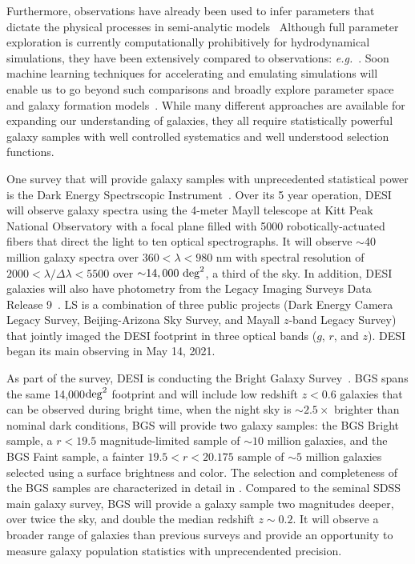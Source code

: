 Furthermore, observations have already been used to infer parameters that
dictate the physical processes in semi-analytic
models~\citep[\emph{e.g.}][]{henriques2009, lu2014, henriques2015} 
Although full parameter exploration is currently computationally prohibitively
for hydrodynamical simulations, they have been extensively compared to
observations: \emph{e.g.}~\cite{genel2014, dave2017a, trayford2017, dickey2021,
donnari2021}.
Soon machine learning techniques for accelerating and emulating simulations
will enable us to go beyond such comparisons and broadly explore parameter
space and galaxy formation
models~\citep[\emph{e.g.}][]{villaescusa-navarro2021}.
While many different approaches are available for expanding our understanding
of galaxies, they all require statistically powerful galaxy samples with
well controlled systematics and well understood selection functions. 

One survey that will provide galaxy samples with unprecedented statistical power
is the Dark Energy Spectrscopic
Instrument~\citep[DESI;][]{desicollaboration2016, desicollaboration2016a}. 
Over its 5 year operation, DESI will observe galaxy spectra using the 4-meter
Mayll telescope at Kitt Peak National Observatory with a focal plane filled
with 5000 robotically-actuated fibers that direct the light to ten optical
spectrographs.
It will observe $\sim$40 million galaxy spectra over $360 < \lambda < 980$ nm
with spectral resolution of $2000 < \lambda/\Delta \lambda < 5500$ over 
${\sim}14,000~{\rm deg}^2$, a third of the sky.
In addition, DESI galaxies will also have photometry from the Legacy Imaging
Surveys Data Release 9~\citep[LS;][]{dey2019}. 
LS is a combination of three public projects (Dark Energy Camera Legacy Survey,
Beijing-Arizona Sky Survey, and Mayall $z$-band Legacy Survey) that jointly
imaged the DESI footprint in three optical bands ($g$, $r$, and $z$). 
DESI began its main observing in May 14, 2021. 

As part of the survey, DESI is conducting the Bright Galaxy
Survey~\citep[BGS;][]{hahn2022}.
BGS spans the same 14,000${\rm deg}^2$ footprint and will include low redshift
$z< 0.6$ galaxies that can be observed during bright time, when the night sky
is ${\sim}2.5\times$ brighter than nominal dark conditions,
BGS will provide two galaxy samples: the BGS Bright sample, a $r < 19.5$
magnitude-limited sample of ${\sim}10$ million galaxies, and the BGS Faint
sample, a fainter $19.5 < r < 20.175$ sample of ${\sim 5}$ million galaxies
selected using a surface brightness and color. 
The selection and completeness of the BGS samples are characterized in detail
in \cite{hahn2023}. 
Compared to the seminal SDSS main galaxy survey, BGS will provide a galaxy
sample two magnitudes deeper, over twice the sky, and double the median
redshift $z{\sim}0.2$. 
It will observe a broader range of galaxies than previous surveys  and provide
an opportunity to measure galaxy population statistics with unprecendented
precision.

